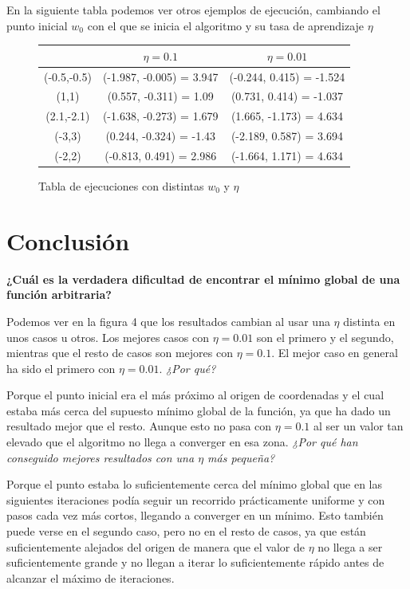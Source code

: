 \documentclass{article}
\begin{document}
    En la siguiente tabla podemos ver otros ejemplos de ejecución, cambiando
    el punto inicial $w_0$ con el que se inicia el algoritmo y su tasa de aprendizaje $\eta$ \par
    \begin{figure}[h]
        \begin{center}
            \begin{tabular}{ |c|c|c| }
                \hline
                & $\eta = 0.1$ & $\eta = 0.01$\\
                \hline
                (-0.5,-0.5) & (-1.987, -0.005) = 3.947 & (-0.244, 0.415) = -1.524\\
                \hline
                (1,1) & (0.557, -0.311) = 1.09 & (0.731, 0.414) = -1.037 \\
                \hline
                (2.1,-2.1) & (-1.638, -0.273) = 1.679 & (1.665, -1.173) = 4.634\\
                \hline
                (-3,3) & (0.244, -0.324) = -1.43 & (-2.189, 0.587) = 3.694\\
                \hline
                (-2,2) & (-0.813, 0.491) = 2.986 & (-1.664, 1.171) = 4.634\\
                \hline
            \end{tabular}
        \end{center}
        \caption{Tabla de ejecuciones con distintas $w_0$ y $\eta$}
    \end{figure}
    \section{Conclusión}
    \textbf{¿Cuál es la verdadera dificultad de encontrar el mínimo global de una función arbitraria?} \par
    Podemos ver en la figura 4 que los resultados cambian al usar una $\eta$ distinta en unos casos u otros. Los mejores casos con
    $\eta = 0.01$ son el primero y el segundo, mientras que el resto de casos son mejores con $\eta = 0.1$.
    El mejor caso en general ha sido el primero con $\eta = 0.01$. \emph{¿Por qué?} \par
    Porque el punto inicial era el más próximo al origen de coordenadas y el cual estaba más cerca del supuesto
    mínimo global de la función, ya que ha dado un resultado mejor que el resto. Aunque esto no pasa con
    $\eta = 0.1$ al ser un valor tan elevado que el algoritmo no llega a converger en esa zona. \emph{¿Por qué han conseguido mejores resultados con una $\eta$ más pequeña?} \par
    Porque el punto estaba lo suficientemente cerca del mínimo global que en las siguientes iteraciones podía seguir
    un recorrido prácticamente uniforme y con pasos cada vez más cortos, llegando a converger en un mínimo. Esto también
    puede verse en el segundo caso, pero no en el resto de casos, ya que están suficientemente alejados del origen
    de manera que el valor de $\eta$ no llega a ser suficientemente grande y no llegan a iterar lo suficientemente rápido antes
    de alcanzar el máximo de iteraciones. \par
\end{document}

